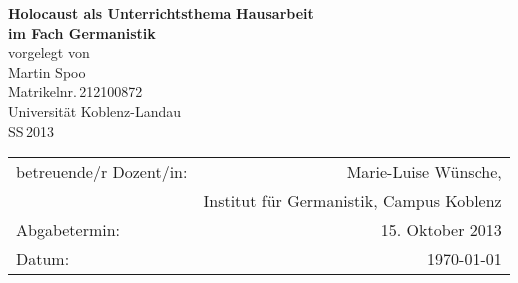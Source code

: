\begin{titlepage}
	\begin{center}
		\quad
		\vfill
		\Huge{
			 \textbf{Holocaust als Unterrichtsthema}
		}
		\vspace{5mm}
		\vfill
		\large{
			{\bf Hausarbeit\\
			im Fach Germanistik}
		}
		\\
		\vspace{0.5cm}
		\large{
			{vorgelegt von\\
			Martin Spoo\\
			Matrikelnr.\,212100872}
		}
		\vspace{1cm}
		\\
		\Large{
			{Universität Koblenz-Landau}\\
			{SS\,2013}
		}
		\vspace{1cm}
		\begin{table}[b]
			\begin{center}
				\begin{tabular}{lr}
					betreuende/r Dozent/in: & Marie-Luise Wünsche, \\
								&	Institut für Germanistik, Campus Koblenz \\
					\vspace{0.5cm}
					Abgabetermin: & 15. Oktober 2013 \\
					Datum: & \today
				\end{tabular}
			\end{center}
		\end{table}
	\end{center}
\end{titlepage}
\renewcommand{\baselinestretch}{1.1}
\restoregeometry

